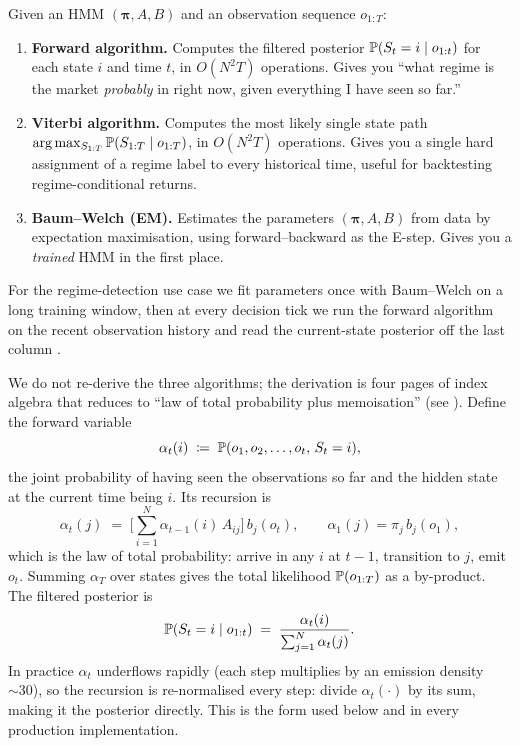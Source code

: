 \begin{keyfactbox}
Given an HMM $(\boldsymbol{\pi}, A, B)$ and an observation sequence
$o_{1:T}$:
\begin{enumerate}
  \item \textbf{Forward algorithm.} Computes the filtered
  posterior $\mathbb{P}(S_t = i \mid o_{1:t})$ for each state $i$
  and time $t$, in $O(N^2 T)$ operations. Gives you ``what
  regime is the market \emph{probably} in right now, given
  everything I have seen so far.''
  \item \textbf{Viterbi algorithm.} Computes the most likely
  single state path
  $\arg\max_{S_{1:T}} \mathbb{P}(S_{1:T} \mid o_{1:T})$, in
  $O(N^2 T)$ operations. Gives you a single hard assignment
  of a regime label to every historical time, useful for
  backtesting regime-conditional returns.
  \item \textbf{Baum--Welch (EM).} Estimates the parameters
  $(\boldsymbol{\pi}, A, B)$ from data by expectation
  maximisation, using forward--backward as the E-step. Gives
  you a \emph{trained} HMM in the first place.
\end{enumerate}
For the regime-detection use case we fit parameters once with
Baum--Welch on a long training window, then at every decision
tick we run the forward algorithm on the recent observation
history and read the current-state posterior off the last column
\citep{quantstart2016hmm}.
\end{keyfactbox}

We do not re-derive the three algorithms; the derivation is
four pages of index algebra that reduces to ``law of total
probability plus memoisation'' (see \citep{rabiner1989tutorial}).
Define the forward variable
\begin{equation}
  \alpha_t(i) \;\coloneqq\; \mathbb{P}(o_1, o_2, \ldots, o_t,\, S_t = i),
  \label{eq:wsw_forward_var}
\end{equation}
the joint probability of having seen the observations so far and
the hidden state at the current time being $i$. Its recursion is
\begin{equation}
  \alpha_{t}(j)
  \;=\;
  \Big[\sum_{i=1}^{N} \alpha_{t-1}(i)\, A_{ij}\Big]\, b_j(o_t),
  \qquad \alpha_1(j) = \pi_j\, b_j(o_1),
  \label{eq:wsw_forward_recursion}
\end{equation}
which is the law of total probability: arrive in any $i$ at $t-1$,
transition to $j$, emit $o_t$. Summing $\alpha_T$ over states
gives the total likelihood $\mathbb{P}(o_{1:T})$ as a by-product. The
filtered posterior is
\begin{equation}
  \mathbb{P}(S_t = i \mid o_{1:t})
  \;=\;
  \frac{\alpha_t(i)}{\sum_{j=1}^{N}\alpha_t(j)}.
  \label{eq:wsw_forward_posterior}
\end{equation}
In practice $\alpha_t$ underflows rapidly (each step multiplies by
an emission density $\sim 30$), so the recursion is re-normalised
every step: divide $\alpha_t(\cdot)$ by its sum, making it the
posterior directly. This is the form used below and in every
production implementation.


